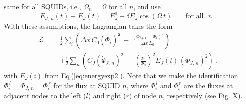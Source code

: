 same for all SQUIDs, i.e., $\Omega_n = \Omega$ for all $n$, and use 
%
\begin{equation} \label{eq:energyexp2}
E_{J,\,n}(t) \equiv E_J(t) = E_J^0 + \delta E_J \cos(\Omega \, t) \qquad \text{for all} \, \, \, \, n \, \, . 
\end{equation}
%
With these assumptions, the Lagrangian takes the form
%
\begin{equation} \label{eq:lagn3}
\begin{split}
\mathcal{L} = \, & \frac{1}{2} \sum_i \left( \Delta x \, C_{0} \left(\dot{\Phi}_{i}\right)^{2} \, - \, 
\frac{\left(\Phi_{i+1} - \Phi_{i}\right)^{2}}{\Delta x \, L_{0}} \right)  \\[2mm]
& + \frac{1}{2} \sum_n \left( C_J \left(\dot{\Phi}_{J,\,n} \right)^{2} \, - \, 
 \left(\frac{2 \pi}{\Phi_0} \right)^2 E_J(t) \, \left( \Phi_{J,\,n} \right)^2 
\right) \, \, .
\end{split}
\end{equation}
%
with $E_J(t)$ from Eq.(\ref{eq:energyexp2}). 
Note that we make the identification $\Phi_i^{\,l} = \Phi_{J,\,n} = \Phi_i^{\,r}$ for the flux at SQUID $n$, 
where $\Phi_i^{\,l}$ and $\Phi_i^{\,r}$ are the fluxes at adjacent nodes to the left ($l$) and right ($r$) of node $n$,
respectively
\color{red} (see Fig. X). 
\color{blue}

